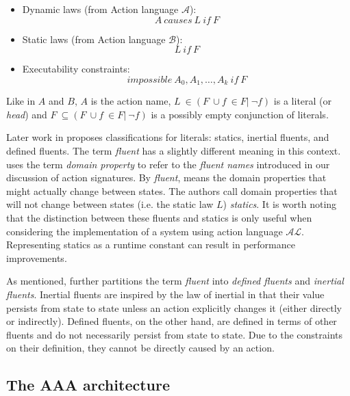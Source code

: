 \begin{itemize}
    \item Dynamic laws (from Action language $ \mathcal{A} $):
        $$
        A\ causes\ L\ if\ F
        $$

    \item Static laws (from Action language $ \mathcal{B} $):
        $$
        L\ if\ F
        $$

    \item Executability constraints:
        $$
        impossible\ A_0, A_1, \dots, A_k\ if\ F
        $$
\end{itemize}

Like in $A$ and $B$, $A$ is the action name, $L\ \in(F\ \cup{f\ \in F|\ \neg f}) $ is a literal (or \textit{head}) and $F\ \subseteq(F\ \cup{f\ \in F|\ \neg f})$ is a possibly empty conjunction of literals.

Later work in \cite{gelfond_knowledge_2014} proposes classifications for literals: statics, inertial fluents, and defined fluents.
The term \textit{fluent} has a slightly different meaning in this context.
\cite{gelfond_knowledge_2014} uses the term \textit{domain property} to refer to the \textit{fluent names} introduced in our discussion of action signatures.
By \textit{fluent}, \cite{gelfond_knowledge_2014} means the domain properties that might actually change between states.
The authors call domain properties that will not change between states (i.e. the static law $L$) \textit{statics}.
It is worth noting that the distinction between these fluents and statics is only useful when considering the implementation of a system using action language $\mathcal{AL}$.
Representing statics as a runtime constant can result in performance improvements.

As mentioned, \cite{gelfond_knowledge_2014} further partitions the term \textit{fluent} into \textit{defined fluents} and \textit{inertial fluents}.
Inertial fluents are inspired by the law of inertial in that their value persists from state to state unless an action explicitly changes it (either directly or indirectly).
Defined fluents, on the other hand, are defined in terms of other fluents and do not necessarily persist from state to state.
Due to the constraints on their definition, they cannot be directly caused by an action.


\subsection{The AAA architecture}
\label{subsec:aaa_architecture}


